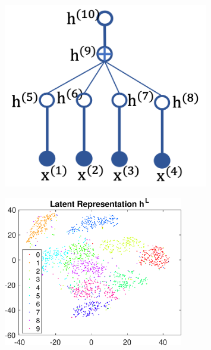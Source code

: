 \documentclass{article}
\begin{document}
\begin{minipage}{\textwidth}
  \begin{minipage}[b]{0.44\textwidth}
  \begin{figure}[H]
    \centering
       \includegraphics[width=0.8\textwidth]{fig/tree_mnist.png}
    \label{fig:struct}
\end{figure}
  \end{minipage}
  \hfill
  \begin{minipage}[b]{0.55\textwidth}
\begin{figure}[H]
    \centering
       \includegraphics[width=0.7\textwidth]{fig/z_Y.eps}
    \label{fig:z_tsne}
\end{figure}
\end{minipage}
\end{minipage}
\end{document}
